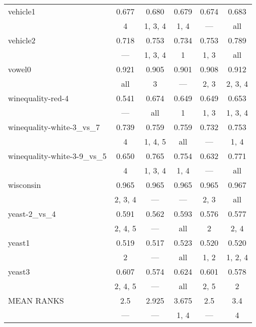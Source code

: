 \begin{tabular}{lccccc}
 vehicle1                   & 0.677   & 0.680   & 0.679   & 0.674    & 0.683    \\
                            & 4       & 1, 3, 4 & 1, 4    & ---      & all      \\
 vehicle2                   & 0.718   & 0.753   & 0.734   & 0.753    & 0.789    \\
                            & ---     & 1, 3, 4 & 1       & 1, 3     & all      \\
 vowel0                     & 0.921   & 0.905   & 0.901   & 0.908    & 0.912    \\
                            & all     & 3       & ---     & 2, 3     & 2, 3, 4  \\
 winequality-red-4          & 0.541   & 0.674   & 0.649   & 0.649    & 0.653    \\
                            & ---     & all     & 1       & 1, 3     & 1, 3, 4  \\
 winequality-white-3\_vs\_7   & 0.739   & 0.759   & 0.759   & 0.732    & 0.753    \\
                            & 4       & 1, 4, 5 & all     & ---      & 1, 4     \\
 winequality-white-3-9\_vs\_5 & 0.650   & 0.765   & 0.754   & 0.632    & 0.771    \\
                            & 4       & 1, 3, 4 & 1, 4    & ---      & all      \\
 wisconsin                  & 0.965   & 0.965   & 0.965   & 0.965    & 0.967    \\
                            & 2, 3, 4 & ---     & ---     & 2, 3     & all      \\
 yeast-2\_vs\_4               & 0.591   & 0.562   & 0.593   & 0.576    & 0.577    \\
                            & 2, 4, 5 & ---     & all     & 2        & 2, 4     \\
 yeast1                     & 0.519   & 0.517   & 0.523   & 0.520    & 0.520    \\
                            & 2       & ---     & all     & 1, 2     & 1, 2, 4  \\
 yeast3                     & 0.607   & 0.574   & 0.624   & 0.601    & 0.578    \\
                            & 2, 4, 5 & ---     & all     & 2, 5     & 2        \\
 \hline
MEAN RANKS                 & 2.5     & 2.925   & 3.675   & 2.5      & 3.4      \\
                            & ---     & ---     & 1, 4    & ---      & 4        \\
\hline
\end{tabular}
